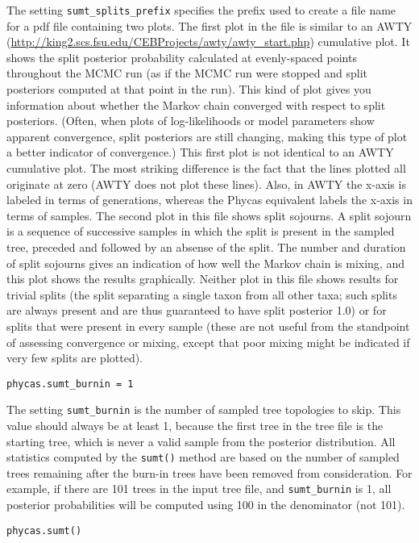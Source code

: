 \documentclass[10pt]{article}
\newcommand{\setting}[1]{{\tt \small #1}\index{#1}}
\begin{document}
%
The setting \setting{sumt\_splits\_prefix} specifies the prefix used to create a file name for a pdf file containing two plots. The first plot in the file is similar to an AWTY (\url{http://king2.scs.fsu.edu/CEBProjects/awty/awty_start.php}) cumulative plot. It shows the split posterior probability calculated at evenly-spaced points throughout the MCMC run (as if the MCMC run were stopped and split posteriors computed at that point in the run). This kind of plot gives you information about whether the Markov chain converged with respect to split posteriors. (Often, when plots of log-likelihoods or model parameters show apparent convergence, split posteriors are still changing, making this type of plot a better indicator of convergence.) This first plot is not identical to an AWTY cumulative plot. The most striking difference is the fact that the lines plotted all originate at zero (AWTY does not plot these lines). Also, in AWTY the x-axis is labeled in terms of generations, whereas the Phycas equivalent labels the x-axis in terms of samples. The second plot in this file shows split sojourns. A split sojourn is a sequence of successive samples in which the split is present in the sampled tree, preceded and followed by an absense of the split. The number and duration of split sojourns gives an indication of how well the Markov chain is mixing, and this plot shows the results graphically. Neither plot in this file shows results for trivial splits (the split separating a single taxon from all other taxa; such splits are always present and are thus guaranteed to have split posterior 1.0) or for splits that were present in every sample (these are not useful from the standpoint of assessing convergence or mixing, except that poor mixing might be indicated if very few splits are plotted).
%
\begin{verbatim}
phycas.sumt_burnin = 1
\end{verbatim}
%
The setting \setting{sumt\_burnin} is the number of sampled tree topologies to skip. This value should always be at least 1, because the first tree in the tree file is the starting tree, which is never a valid sample from the posterior distribution. All statistics computed by the {\tt sumt()} method are based on the number of sampled trees remaining after the burn-in trees have been removed from consideration. For example, if there are 101 trees in the input tree file, and \setting{sumt\_burnin} is 1, all posterior probabilities will be computed using 100 in the denominator (not 101).
%
\begin{verbatim}
phycas.sumt()
\end{verbatim}
\end{document}
